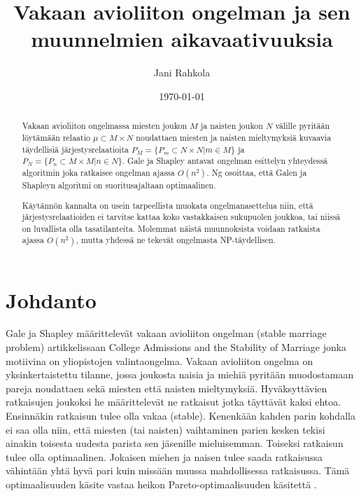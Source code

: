 \documentclass[gradu, twoside]{tktltiki}
\begin{document}
\title{Vakaan avioliiton ongelman ja sen muunnelmien aikavaativuuksia}
\author{Jani Rahkola}
\date{\today}
\level{}

\maketitle

\doublespacing

\subject{Tietojenkäsittelytiede}

\begin{abstract}
  Vakaan avioliiton ongelmassa miesten joukon $M$ ja naisten joukon
  $N$ välille pyritään löytämään relaatio $\mu \subset M \times N$
  noudattaen miesten ja naisten mieltymyksiä kuvaavia täydellisiä
  järjestysrelaatioita $P_M = \{P_m \subset N \times N | m \in M\}$ ja
  $P_N = \{P_n \subset M \times M | n \in N\}$. Gale ja Shapley
  antavat ongelman esittelyn yhteydessä algoritmin joka ratkaisee
  ongelman ajassa $O(n^2)$. Ng osoittaa, että Galen ja Shapleyn
  algoritmi on suoritusajaltaan optimaalinen.

  Käytännön kannalta on usein tarpeellista muokata ongelmanasettelua
  niin, että järjestysrelaatioiden ei tarvitse kattaa koko vastakkaisen
  sukupuolen joukkoa, tai niissä on luvallista olla tasatilanteita.
  Molemmat näistä muunnoksista voidaan ratkaista ajassa $O(n^2)$, mutta
  yhdessä ne tekevät ongelmasta NP-täydellisen.
\end{abstract}

\mytableofcontents

\section{Johdanto}

Gale ja Shapley määrittelevät vakaan avioliiton ongelman (stable
marriage problem) artikkelissaan College Admissions and the Stability
of Marriage \cite{galeshapley62} jonka motiivina on yliopistojen
valintaongelma. Vakaan avioliiton ongelma on yksinkertaistettu
tilanne, jossa joukosta naisia ja miehiä pyritään muodostamaan pareja
noudattaen sekä miesten että naisten mieltymyksiä. Hyväksyttävien
ratkaisujen joukoksi he määrittelevät ne ratkaisut jotka täyttävät
kaksi ehtoa. Ensinnäkin ratkaisun tulee olla vakaa (stable). Kenenkään
kahden parin kohdalla ei saa olla niin, että miesten (tai naisten)
vaihtaminen parien kesken tekisi ainakin toisesta uudesta parista sen
jäsenille mieluisemman. Toiseksi ratkaisun tulee olla optimaalinen.
Jokaisen miehen ja naisen tulee saada ratkaisussa vähintään yhtä hyvä
pari kuin missään muussa mahdollisessa ratkaisussa. Tämä
optimaalisuuden käsite vastaa heikon Pareto-optimaalisuuden käsitettä
\cite{gusfield89}.
\end{document}
